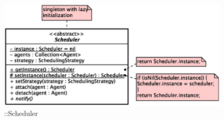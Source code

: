 \begin{figure}[h]
\centering
\includegraphics[scale=0.6,keepaspectratio]{images/solution/app/backend/scheduler.eps}
\caption{\pScheduling::Scheduler}
\label{fig:sd-app-scheduling-scheduler}
\end{figure}
\FloatBarrier
